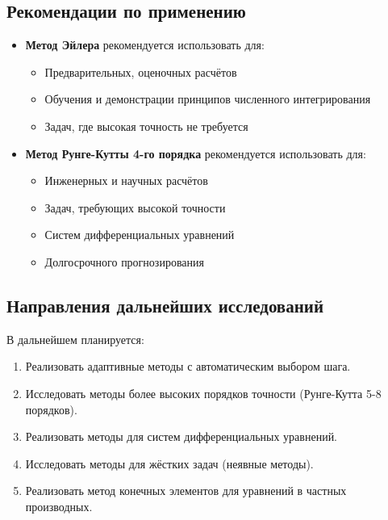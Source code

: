 \documentclass[a4paper,12pt]{article}
\begin{document}
\subsection{Рекомендации по применению}

\begin{itemize}
    \item \textbf{Метод Эйлера} рекомендуется использовать для:
        \begin{itemize}
            \item Предварительных, оценочных расчётов
            \item Обучения и демонстрации принципов численного интегрирования
            \item Задач, где высокая точность не требуется
        \end{itemize}
    
    \item \textbf{Метод Рунге-Кутты 4-го порядка} рекомендуется использовать для:
        \begin{itemize}
            \item Инженерных и научных расчётов
            \item Задач, требующих высокой точности
            \item Систем дифференциальных уравнений
            \item Долгосрочного прогнозирования
        \end{itemize}
\end{itemize}

\subsection{Направления дальнейших исследований}

В дальнейшем планируется:
\begin{enumerate}
    \item Реализовать адаптивные методы с автоматическим выбором шага.
    \item Исследовать методы более высоких порядков точности (Рунге-Кутта 5-8 порядков).
    \item Реализовать методы для систем дифференциальных уравнений.
    \item Исследовать методы для жёстких задач (неявные методы).
    \item Реализовать метод конечных элементов для уравнений в частных производных.
\end{enumerate}

\newpage
\end{document}
